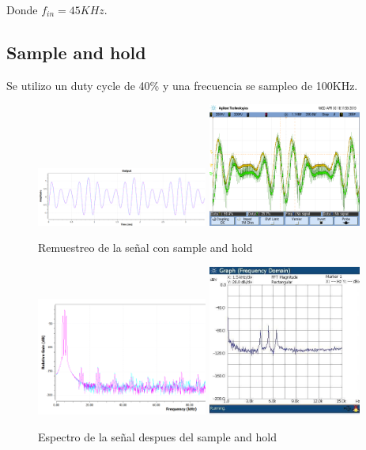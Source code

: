 \documentclass[../../ASSD_TP1_G7.tex]{subfiles}
\begin{document}
Donde $f_{in}=45KHz$.

\subsection*{Sample and hold}
Se utilizo un duty cycle de 40\% y una frecuencia se sampleo de 100KHz.
\begin{figure}[H]
\centering
{}
{\includegraphics[width=0.5\textwidth]{figures/simsyh_pto_7_4.png}}
{\includegraphics[width=0.45\textwidth]{figures/syh_pto_7_4.png}}
\caption{Remuestreo de la se\~nal con sample and hold}
\end{figure}

\begin{figure}[H]
\centering
{}
{\includegraphics[width=0.5\textwidth]{figures/simespectosyh.PNG}}
{\includegraphics[width=0.45\textwidth]{figures/syh.jpeg}}
\caption{Espectro de la se\~nal despues del sample and hold}
\end{figure}
\end{document}
